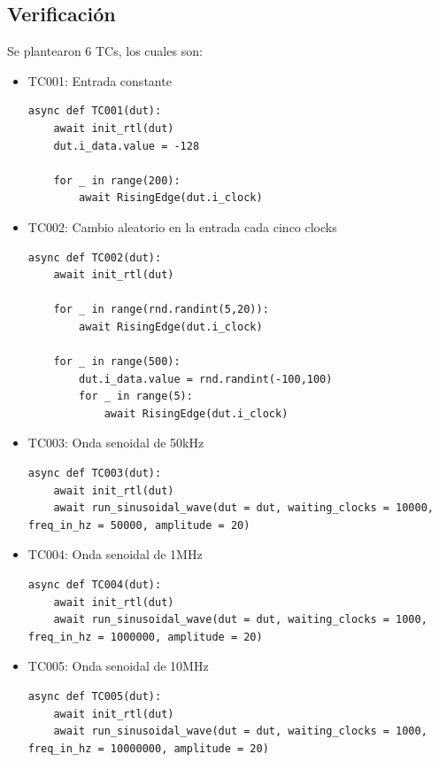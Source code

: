 \subsection{Verificación}
Se plantearon 6 TCs, los cuales son:
\begin{itemize}
    \item TC001: Entrada constante
        \begin{verbatim}
async def TC001(dut):
    await init_rtl(dut)
    dut.i_data.value = -128

    for _ in range(200):
        await RisingEdge(dut.i_clock)
        \end{verbatim}

    \item TC002: Cambio aleatorio en la entrada cada cinco clocks
        \begin{verbatim}
async def TC002(dut):
    await init_rtl(dut)

    for _ in range(rnd.randint(5,20)):
        await RisingEdge(dut.i_clock)

    for _ in range(500):
        dut.i_data.value = rnd.randint(-100,100)
        for _ in range(5):
            await RisingEdge(dut.i_clock)
        \end{verbatim}

    \item TC003: Onda senoidal de 50kHz
        \begin{verbatim}
async def TC003(dut):
    await init_rtl(dut)
    await run_sinusoidal_wave(dut = dut, waiting_clocks = 10000, freq_in_hz = 50000, amplitude = 20)
        \end{verbatim}

    \item TC004: Onda senoidal de 1MHz
        \begin{verbatim}
async def TC004(dut):
    await init_rtl(dut)
    await run_sinusoidal_wave(dut = dut, waiting_clocks = 1000, freq_in_hz = 1000000, amplitude = 20)
        \end{verbatim}

    \item TC005: Onda senoidal de 10MHz
        \begin{verbatim}
async def TC005(dut):
    await init_rtl(dut)
    await run_sinusoidal_wave(dut = dut, waiting_clocks = 1000, freq_in_hz = 10000000, amplitude = 20)
        \end{verbatim}


\end{itemize}
